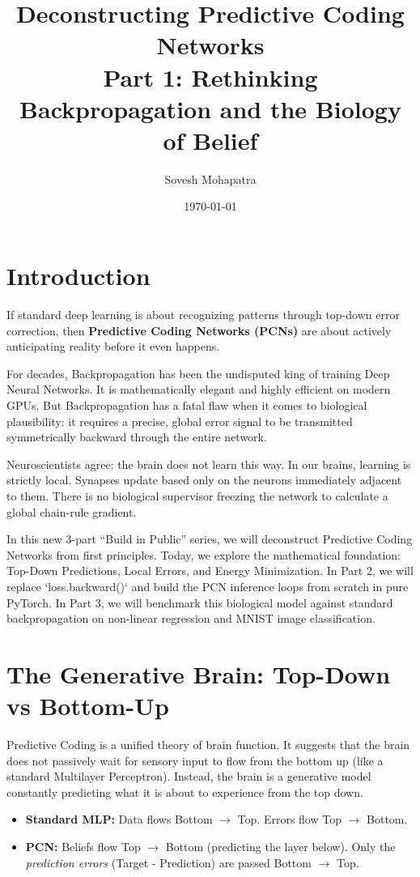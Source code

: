\documentclass[12pt]{article}
\title{\textbf{Deconstructing Predictive Coding Networks \\ Part 1: Rethinking Backpropagation and the Biology of Belief}}
\author{Sovesh Mohapatra}
\date{\today}
\begin{document}
\maketitle

\section*{Introduction}
If standard deep learning is about recognizing patterns through top-down error correction, then \textbf{Predictive Coding Networks (PCNs)} are about actively anticipating reality before it even happens. 

For decades, Backpropagation has been the undisputed king of training Deep Neural Networks. It is mathematically elegant and highly efficient on modern GPUs. But Backpropagation has a fatal flaw when it comes to biological plausibility: it requires a precise, global error signal to be transmitted symmetrically backward through the entire network. 

Neuroscientists agree: the brain does not learn this way. In our brains, learning is strictly local. Synapses update based only on the neurons immediately adjacent to them. There is no biological supervisor freezing the network to calculate a global chain-rule gradient.

In this new 3-part ``Build in Public'' series, we will deconstruct Predictive Coding Networks from first principles. Today, we explore the mathematical foundation: Top-Down Predictions, Local Errors, and Energy Minimization. In Part 2, we will replace `loss.backward()` and build the PCN inference loops from scratch in pure PyTorch. In Part 3, we will benchmark this biological model against standard backpropagation on non-linear regression and MNIST image classification.

\section*{The Generative Brain: Top-Down vs Bottom-Up}

Predictive Coding is a unified theory of brain function. It suggests that the brain does not passively wait for sensory input to flow from the bottom up (like a standard Multilayer Perceptron). Instead, the brain is a generative model constantly predicting what it is about to experience from the top down.

\begin{itemize}
    \item \textbf{Standard MLP:} Data flows Bottom $\rightarrow$ Top. Errors flow Top $\rightarrow$ Bottom.
    \item \textbf{PCN:} Beliefs flow Top $\rightarrow$ Bottom (predicting the layer below). Only the \textit{prediction errors} (Target - Prediction) are passed Bottom $\rightarrow$ Top.
\end{itemize}
\end{document}
